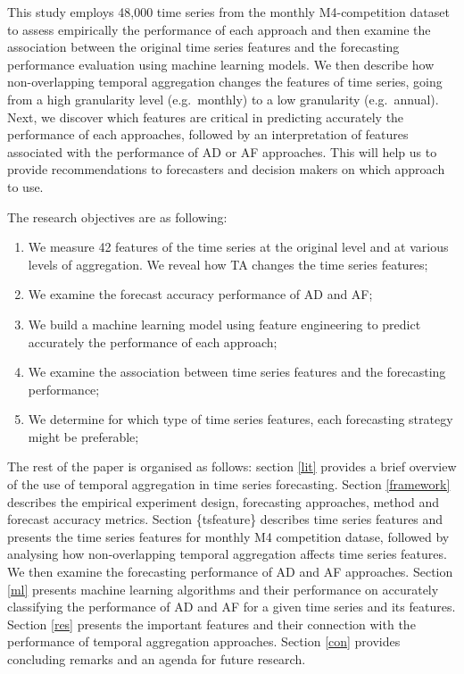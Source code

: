 \documentclass[]{elsarticle} %
\providecommand{\tightlist}{%
  \setlength{\itemsep}{0pt}\setlength{\parskip}{0pt}}
\begin{document}
This study employs 48,000 time series from the monthly M4-competition
dataset to assess empirically the performance of each approach and then
examine the association between the original time series features and
the forecasting performance evaluation using machine learning models. We
then describe how non-overlapping temporal aggregation changes the
features of time series, going from a high granularity level
(e.g.~monthly) to a low granularity (e.g.~annual). Next, we discover
which features are critical in predicting accurately the performance of
each approaches, followed by an interpretation of features associated
with the performance of AD or AF approaches. This will help us to
provide recommendations to forecasters and decision makers on which
approach to use.

The research objectives are as following:

\begin{enumerate}
\def\labelenumi{\arabic{enumi}.}
\tightlist
\item
  We measure 42 features of the time series at the original level and at
  various levels of aggregation. We reveal how TA changes the time
  series features;
\item
  We examine the forecast accuracy performance of AD and AF;
\item
  We build a machine learning model using feature engineering to predict
  accurately the performance of each approach;
\item
  We examine the association between time series features and the
  forecasting performance;
\item
  We determine for which type of time series features, each forecasting
  strategy might be preferable;
\end{enumerate}

The rest of the paper is organised as follows: section \ref{lit}
provides a brief overview of the use of temporal aggregation in time
series forecasting. Section \ref{framework} describes the empirical
experiment design, forecasting approaches, method and forecast accuracy
metrics. Section \{tsfeature\} describes time series features and
presents the time series features for monthly M4 competition datase,
followed by analysing how non-overlapping temporal aggregation affects
time series features. We then examine the forecasting performance of AD
and AF approaches. Section \ref{ml} presents machine learning algorithms
and their performance on accurately classifying the performance of AD
and AF for a given time series and its features. Section \ref{res}
presents the important features and their connection with the
performance of temporal aggregation approaches. Section \ref{con}
provides concluding remarks and an agenda for future research.
\end{document}
